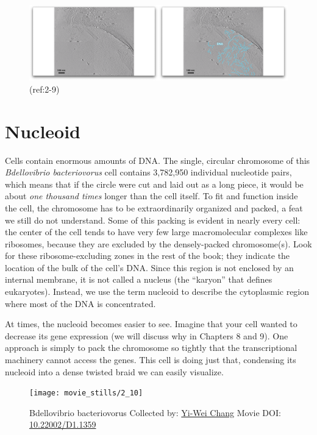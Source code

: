 \documentclass[]{tufte-book}
\begin{document}
\begin{figure}
\includegraphics{movie_stills/2_9} \caption[(ref:2-9)]{(ref:2-9)}\label{fig:2-9}
\end{figure}

\section{Nucleoid}\label{nucleoid}

Cells contain enormous amounts of DNA. The single, circular chromosome
of this \emph{Bdellovibrio bacteriovorus} cell contains 3,782,950
individual nucleotide pairs, which means that if the circle were cut and
laid out as a long piece, it would be about \emph{one thousand times}
longer than the cell itself. To fit and function inside the cell, the
chromosome has to be extraordinarily organized and packed, a feat we
still do not understand. Some of this packing is evident in nearly every
cell: the center of the cell tends to have very few large macromolecular
complexes like ribosomes, because they are excluded by the
densely-packed chromosome(s). Look for these ribosome-excluding zones in
the rest of the book; they indicate the location of the bulk of the
cell's DNA. Since this region is not enclosed by an internal membrane,
it is not called a nucleus (the ``karyon'' that defines eukaryotes).
Instead, we use the term nucleoid to describe the cytoplasmic region
where most of the DNA is concentrated.

At times, the nucleoid becomes easier to see. Imagine that your cell
wanted to decrease its gene expression (we will discuss why in Chapters
8 and 9). One approach is simply to pack the chromosome so tightly that
the transcriptional machinery cannot access the genes. This cell is
doing just that, condensing its nucleoid into a dense twisted braid we
can easily visualize.





\begin{figure}
\texttt{[image: movie\_stills/2\_10]} \caption[Bdellovibrio bacteriovorus Collected by:
\protect\hyperlink{yi-wei_chang}{Yi-Wei Chang} Movie DOI:
\href{https://doi.org/10.22002/D1.1359}{10.22002/D1.1359}]{Bdellovibrio bacteriovorus Collected by:
\protect\hyperlink{yi-wei_chang}{Yi-Wei Chang} Movie DOI:
\href{https://doi.org/10.22002/D1.1359}{10.22002/D1.1359}}\label{fig:2-10}
\end{figure}
\end{document}
